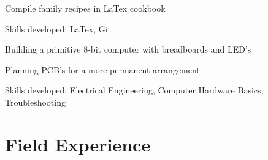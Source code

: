 \documentclass[letterpaper]{resume}
\begin{document}
\begin{compactitem}
\item Compile family recipes in LaTex cookbook
\item Skills developed: LaTex, Git
\end{compactitem}

\begin{compactitem}
\item Building a primitive 8-bit computer with breadboards and LED's
\item Planning PCB's for a more permanent arrangement
\item Skills developed: Electrical Engineering, Computer Hardware Basics, Troubleshooting
\end{compactitem}

\section{Field Experience}
\end{document}
